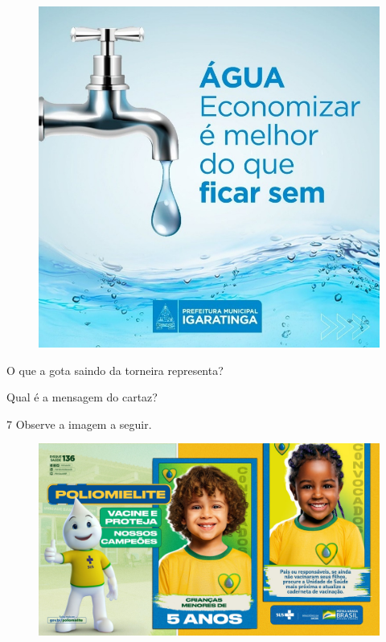 \begin{figure}[H]
\centering
\includegraphics[width=.8\textwidth]{media/image133.jpeg}
\end{figure}


\begin{escolha}
\item O que a gota saindo da torneira representa?\\

\item Qual é a mensagem do cartaz?\\
\end{escolha}

\num{7} Observe a imagem a seguir.

\begin{figure}[H]
\centering
\includegraphics[width=.8\textwidth]{media/image206.jpg}
\end{figure}

